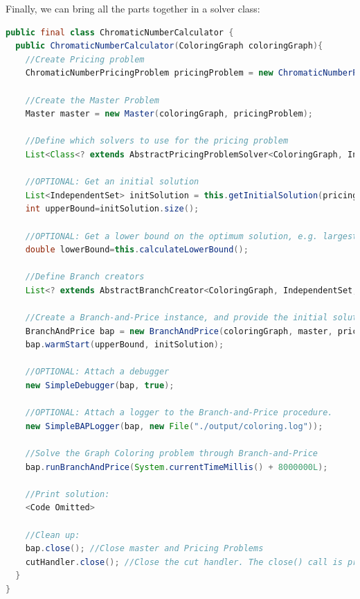 \documentclass[a4paper]{article}
\newenvironment{myblock}[1]{%
    \tcolorbox[beamer,%
    noparskip,breakable,
    colback=lightBlueCodeBlock,colframe=darkBlueCodeBlock,%
    colbacklower=darkBlueCodeBlock!75!lightBlueCodeBlock,%
    coltitle=blueTitleCodeBlock,
    title=#1]}%
    {\endtcolorbox}
\begin{document}
Finally, we can bring all the parts together in a solver class:
\begin{myblock}{ChromaticNumberCalculator}
\begin{lstlisting}[language=java, style=eclipseArticle, xleftmargin=2em]  
public final class ChromaticNumberCalculator {
  public ChromaticNumberCalculator(ColoringGraph coloringGraph){
    //Create Pricing problem
    ChromaticNumberPricingProblem pricingProblem = new ChromaticNumberPricingProblem(coloringGraph, "chromaticNumberPricingProblem");

    //Create the Master Problem
    Master master = new Master(coloringGraph, pricingProblem);

    //Define which solvers to use for the pricing problem
    List<Class<? extends AbstractPricingProblemSolver<ColoringGraph, IndependentSet, ChromaticNumberPricingProblem>>> solvers = Collections.singletonList(ExactPricingProblemSolver.class);

    //OPTIONAL: Get an initial solution
    List<IndependentSet> initSolution = this.getInitialSolution(pricingProblem);
    int upperBound=initSolution.size();

    //OPTIONAL: Get a lower bound on the optimum solution, e.g. largest clique in the graph
    double lowerBound=this.calculateLowerBound();

    //Define Branch creators
    List<? extends AbstractBranchCreator<ColoringGraph, IndependentSet, ChromaticNumberPricingProblem>> branchCreators = Collections.singletonList(new BranchOnVertexPair(coloringGraph, pricingProblem));

    //Create a Branch-and-Price instance, and provide the initial solution as a warm-start
    BranchAndPrice bap = new BranchAndPrice(coloringGraph, master, pricingProblem, solvers, branchCreators, lowerBound, upperBound);
    bap.warmStart(upperBound, initSolution);

    //OPTIONAL: Attach a debugger
    new SimpleDebugger(bap, true);

    //OPTIONAL: Attach a logger to the Branch-and-Price procedure.
    new SimpleBAPLogger(bap, new File("./output/coloring.log"));

    //Solve the Graph Coloring problem through Branch-and-Price
    bap.runBranchAndPrice(System.currentTimeMillis() + 8000000L);

    //Print solution:
    <Code Omitted>

    //Clean up:
    bap.close(); //Close master and Pricing Problems
    cutHandler.close(); //Close the cut handler. The close() call is propagated to all registered AbstractCutGenerator classes
  }
}
\end{lstlisting}
\end{myblock}
\end{document}
